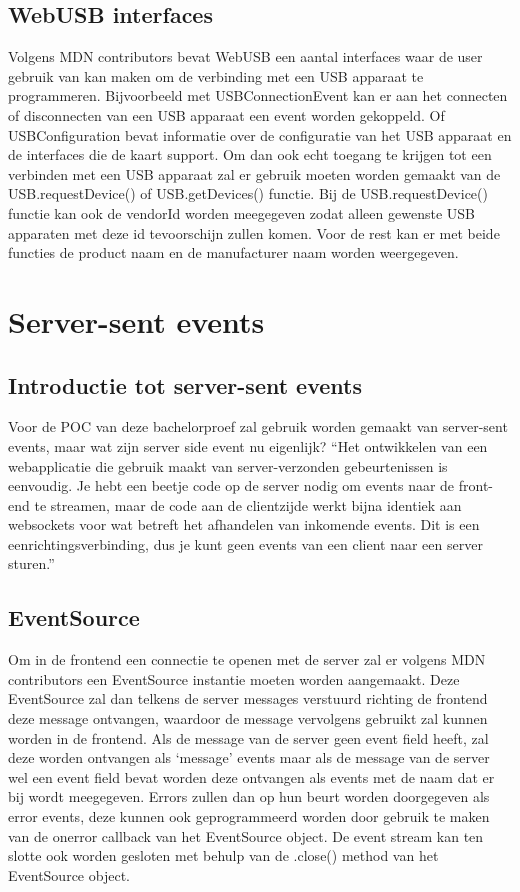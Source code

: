 \subsection{WebUSB interfaces}
Volgens MDN contributors bevat WebUSB een aantal interfaces waar de user gebruik van kan maken om de verbinding met een USB apparaat te programmeren. Bijvoorbeeld met USBConnectionEvent kan er aan het connecten of disconnecten van een USB apparaat een event worden gekoppeld. Of USBConfiguration bevat informatie over de configuratie van het USB apparaat en de interfaces die de kaart support.
Om dan ook echt toegang te krijgen tot een verbinden met een USB apparaat zal er gebruik moeten worden gemaakt van de USB.requestDevice() of USB.getDevices()  functie. Bij de USB.requestDevice() functie kan ook de vendorId worden meegegeven zodat alleen gewenste USB apparaten met deze id tevoorschijn zullen komen. Voor de rest kan er met beide functies de product naam en de manufacturer naam worden weergegeven.


\section{Server-sent events}
\subsection{Introductie tot server-sent events}
Voor de POC van deze bachelorproef zal gebruik worden gemaakt van server-sent events, maar wat zijn server side event nu eigenlijk?
``Het ontwikkelen van een webapplicatie die gebruik maakt van server-verzonden gebeurtenissen is eenvoudig. Je hebt een beetje code op de server nodig om events naar de front-end te streamen, maar de code aan de clientzijde werkt bijna identiek aan websockets voor wat betreft het afhandelen van inkomende events. Dit is een eenrichtingsverbinding, dus je kunt geen events van een client naar een server sturen.''

\subsection{EventSource}
Om in de frontend een connectie te openen met de server zal er volgens MDN contributors een EventSource instantie moeten worden aangemaakt. Deze EventSource zal dan telkens de server messages verstuurd richting de frontend deze message ontvangen, waardoor de message vervolgens gebruikt zal kunnen worden in de frontend.
Als de message van de server geen event field heeft, zal deze worden ontvangen als ‘message’ events maar als de message van de server wel een event field bevat worden deze ontvangen als events met de naam dat er bij wordt meegegeven. Errors zullen dan op hun beurt worden doorgegeven als error events, deze kunnen ook geprogrammeerd worden door gebruik te maken van de onerror callback van het EventSource object. De event stream kan ten slotte ook worden gesloten met behulp van de .close() method van het EventSource object.

